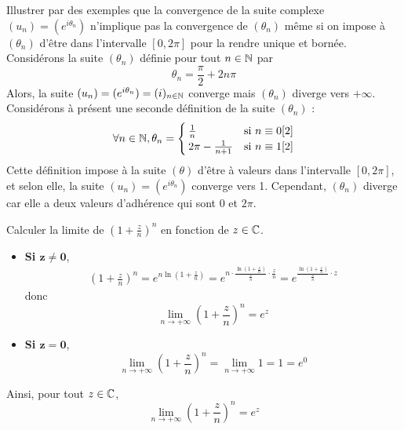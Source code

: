 \documentclass{article}
\begin{document}
\begin{question_kholle}{Illustrer par des exemples que la convergence
    de la suite complexe $(u_{n})=(e^{i \theta_{n}})$ n’implique pas la
    convergence de $(\theta_{n})$ même si on impose à $(\theta_{n})$
    d’être dans l’intervalle $[0,2 \pi]$ pour la rendre unique et bornée.}
  Considérons la suite $(\theta_{n})$ définie pour tout $n\in\mathbb N$ par
  \[
    \theta_{n}=\frac{\pi}{2}+2n \pi
  \]
  Alors, la suite $(u_{n})=(e^{i \theta_{n}}) = (i)_{n\in\mathbb N}$
  converge mais $(\theta_{n})$ diverge vers $+\infty$.\\
  Considérons à présent une seconde définition de la suite $(\theta_{n})$ :
  \[
    \forall n\in\mathbb N, \theta_{n}=
    \begin{cases}
      \frac{1}{n}           & \text{si } n\equiv 0[2] \\
      2 \pi - \frac{1}{n+1} & \text{si } n\equiv 1[2]
    \end{cases}
  \]
  Cette définition impose à la suite $(\theta)$ d’être à valeurs dans
  l’intervalle $[0,2 \pi]$, et selon elle, la suite $(u_{n})=(e^{i
        \theta_{n}})$ converge vers 1. Cependant, $(\theta_{n})$ diverge
  car elle a deux valeurs d’adhérence qui sont $0$ et $2 \pi$.

\end{question_kholle}

\begin{question_kholle}{Calculer la limite de $\displaystyle
      \left(1+\frac{z}{n}\right)^{n}$ en fonction de $z\in\mathbb C$.}
  \begin{itemize}
    \hfill\\
    \item \textbf{Si $\bm{z\neq 0}$},
          \begin{align*}
            \left(1+\frac{z}{n}\right)^{n} = e^{n\ln
                \left(1+\frac{z}{n}\right)} = e^{n\cdot \frac{\ln \left(1+
                  \frac{z}{n}\right)}{\frac{z}{n}}\cdot \frac{z}{n}} =
            e^{\frac{\ln \left(1+\frac{z}{n}\right)}{\frac{z}{n}}\cdot z}
          \end{align*}
          donc
          \[
            \lim_{n\to +\infty} \left(1+\frac{z}{n}\right)^{n} = e^{z}
          \]
    \item \textbf{Si $\bm{z=0}$},
          \[
            \lim_{n\to+\infty}\left(1+\frac{z}{n}\right)^{n} =
            \lim_{n\to+\infty}1=1=e^{0}
          \]
  \end{itemize}
  Ainsi, pour tout $z\in\mathbb C$,
  \[
    \lim_{n\to+\infty} \left(1+\frac{z}{n}\right)^{n}=e^{z}
  \]

\end{question_kholle}
\end{document}
